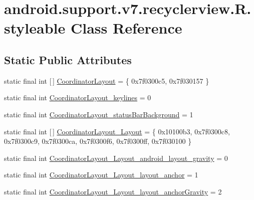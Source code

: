 \hypertarget{classandroid_1_1support_1_1v7_1_1recyclerview_1_1_r_1_1styleable}{}\section{android.\+support.\+v7.\+recyclerview.\+R.\+styleable Class Reference}
\label{classandroid_1_1support_1_1v7_1_1recyclerview_1_1_r_1_1styleable}
\subsection*{Static Public Attributes}
\begin{DoxyCompactItemize}
\item 
static final int \mbox{[}$\,$\mbox{]} \mbox{\hyperlink{classandroid_1_1support_1_1v7_1_1recyclerview_1_1_r_1_1styleable_a5c8296ec4fdbed0654844519034e8cef}{Coordinator\+Layout}} = \{ 0x7f0300c5, 0x7f030157 \}
\item 
static final int \mbox{\hyperlink{classandroid_1_1support_1_1v7_1_1recyclerview_1_1_r_1_1styleable_abfeca793e1a8cc3baec40b40b17a2bd2}{Coordinator\+Layout\+\_\+keylines}} = 0
\item 
static final int \mbox{\hyperlink{classandroid_1_1support_1_1v7_1_1recyclerview_1_1_r_1_1styleable_a06918c057a71db2fac71ffe86303a205}{Coordinator\+Layout\+\_\+status\+Bar\+Background}} = 1
\item 
static final int \mbox{[}$\,$\mbox{]} \mbox{\hyperlink{classandroid_1_1support_1_1v7_1_1recyclerview_1_1_r_1_1styleable_a1a90fc95b73b5ce68225cd8b7ae4f213}{Coordinator\+Layout\+\_\+\+Layout}} = \{ 0x10100b3, 0x7f0300c8, 0x7f0300c9, 0x7f0300ca, 0x7f0300f6, 0x7f0300ff, 0x7f030100 \}
\item 
static final int \mbox{\hyperlink{classandroid_1_1support_1_1v7_1_1recyclerview_1_1_r_1_1styleable_aed1b91df749e3b0461a755feaf8b835e}{Coordinator\+Layout\+\_\+\+Layout\+\_\+android\+\_\+layout\+\_\+gravity}} = 0
\item 
static final int \mbox{\hyperlink{classandroid_1_1support_1_1v7_1_1recyclerview_1_1_r_1_1styleable_a0dc376dc3768c6519f17121792535388}{Coordinator\+Layout\+\_\+\+Layout\+\_\+layout\+\_\+anchor}} = 1
\item 
static final int \mbox{\hyperlink{classandroid_1_1support_1_1v7_1_1recyclerview_1_1_r_1_1styleable_acd40d6b4ee5d15882765df445a3294bb}{Coordinator\+Layout\+\_\+\+Layout\+\_\+layout\+\_\+anchor\+Gravity}} = 2
\item 

\end{DoxyCompactItemize}
